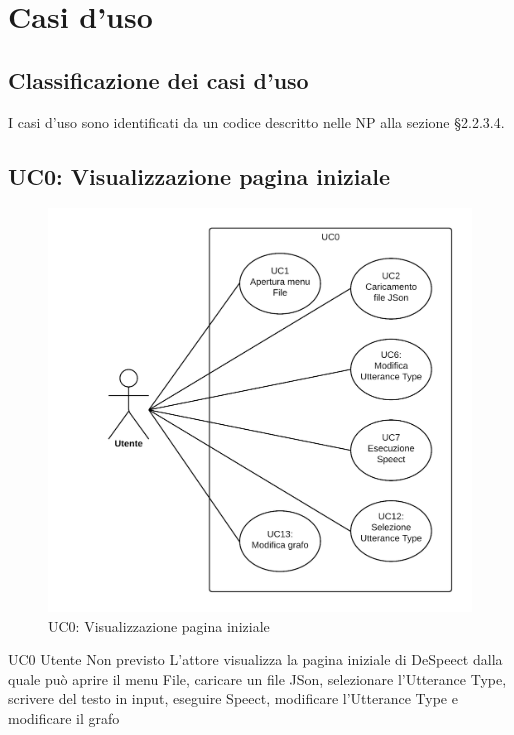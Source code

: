 \documentclass[../AnalisideiRequisiti.tex]{subfiles}
\begin{document}

	\chapter{Casi d'uso}
	\section{Classificazione dei casi d'uso}
	I casi d'uso sono identificati da un codice descritto nelle NP alla sezione §2.2.3.4. 
	
 	
	\section{UC0: Visualizzazione pagina iniziale}
	\begin{figure}[H]
 
		\centering
 
		\includegraphics[width=\textwidth]{../img/UC0.png}
 
		\caption{UC0: Visualizzazione pagina iniziale}
 
	\end{figure}
	\UserCase
	{UC0}
	{Utente}
	{Non previsto}
	{L'attore visualizza la pagina iniziale di DeSpeect dalla quale può aprire il menu File, caricare un file JSon, selezionare l'Utterance Type, scrivere del testo in input, eseguire Speect, modificare l'Utterance Type e modificare il grafo}
\end{document}
